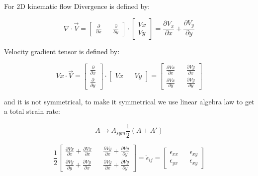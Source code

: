 \documentclass{article}
\begin{document}
    For 2D kinematic flow Divergence is defined by:

    \begin{equation}
        \nabla \cdot \vec{V} = \begin{bmatrix} \frac{\partial}{\partial x} && \frac{\partial}{\partial y} \end{bmatrix} \cdot \begin{bmatrix} Vx \\ Vy \end{bmatrix} = \frac{\partial V_x}{\partial x} + \frac{\partial V_y}{\partial y}
    \end{equation}

    Velocity gradient tensor is defined by:

    \begin{equation}
        Vx \cdot \vec{V} = \begin{bmatrix}\frac{\partial}{\partial x} \\ \frac{\partial}{\partial y} \end{bmatrix} \cdot \begin{bmatrix} Vx && Vy \end{bmatrix} =
        \begin{bmatrix} \frac{\partial Vx}{\partial x} && \frac{\partial Vy}{\partial x}
        \\ \frac{\partial Vx}{\partial y} && \frac{\partial Vy}{\partial y} \end{bmatrix}
    \end{equation}

    and it is not symmetrical, to make it symmetrical we use linear algebra law to get a total strain rate:

    $$
    A \rightarrow  A_{sym} \frac{1}{2}(A + A')
    $$

    \begin{equation}
        \frac{1}{2} \begin{bmatrix} \frac{\partial Vx}{\partial x} + \frac{\partial Vx}{\partial x} && \frac{\partial Vy}{\partial x} + \frac{\partial Vy}{\partial y}
        \\ \frac{\partial Vy}{\partial y} + \frac{\partial Vy}{\partial x} && \frac{\partial Vy}{\partial x} + \frac{\partial Vy}{\partial y} \end{bmatrix} = \dot{\epsilon}_{ij} = \begin{bmatrix} \epsilon_{xx} && \epsilon_{xy} \\ \epsilon_{yx} && \epsilon_{xy} \end{bmatrix}
    \end{equation}
\end{document}
